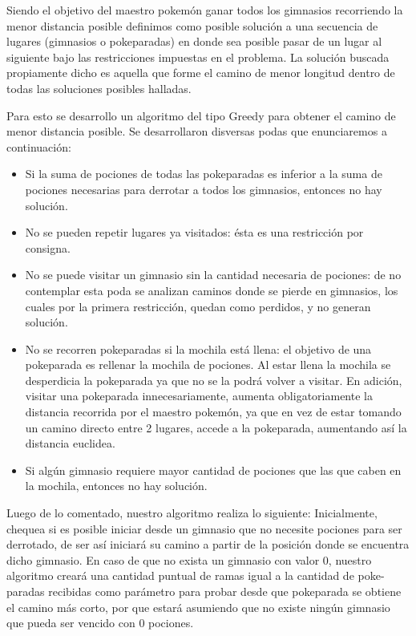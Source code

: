 Siendo el objetivo del maestro pokem\'on ganar todos los gimnasios recorriendo la menor distancia posible definimos como posible solución a una secuencia de lugares (gimnasios o pokeparadas) en donde sea posible pasar de un lugar al siguiente bajo las restricciones impuestas en el problema. La solución buscada propiamente dicho es aquella que forme el camino de menor longitud dentro de todas las soluciones posibles halladas.

Para esto se desarrollo un algoritmo del tipo Greedy para obtener el camino de menor distancia posible. Se desarrollaron disversas podas que enunciaremos a continuaci\'on:

\begin{itemize}
\item Si la suma de pociones de todas las pokeparadas es inferior a la suma de pociones necesarias para derrotar a todos los gimnasios, entonces no hay solución.
\item No se pueden repetir lugares ya visitados: ésta es una restricción por consigna.
\item No se puede visitar un gimnasio sin la cantidad necesaria de pociones: de no contemplar esta poda se analizan caminos donde se pierde en gimnasios, los cuales por la primera restricci\'on, quedan como perdidos, y no generan solución.
\item No se recorren pokeparadas si la mochila está llena: el objetivo de una pokeparada es rellenar la mochila de pociones. Al estar llena la mochila se desperdicia la pokeparada ya que no se la podrá volver a visitar. En adición, visitar una pokeparada innecesariamente, aumenta obligatoriamente la distancia recorrida por el maestro pokem\'on, ya que en vez de estar tomando un camino directo entre 2 lugares, accede a la pokeparada, aumentando as\'i la distancia euclidea.
\item Si algún gimnasio requiere mayor cantidad de pociones que las que caben en la mochila, entonces no hay solución. 
\end{itemize}

Luego de lo comentado, nuestro algoritmo realiza lo siguiente:
Inicialmente, chequea si es posible iniciar desde un gimnasio que no necesite pociones para ser derrotado, de ser as\'i iniciar\'a su camino a partir de la posici\'on donde se encuentra dicho gimnasio. En caso de que no exista un gimnasio con valor 0, nuestro algoritmo crear\'a una cantidad puntual de ramas igual a la cantidad de poke-paradas recibidas como par\'ametro para probar desde que pokeparada se obtiene el camino m\'as corto, por que estar\'a asumiendo que no existe ning\'un gimnasio que pueda ser vencido con 0 pociones.


